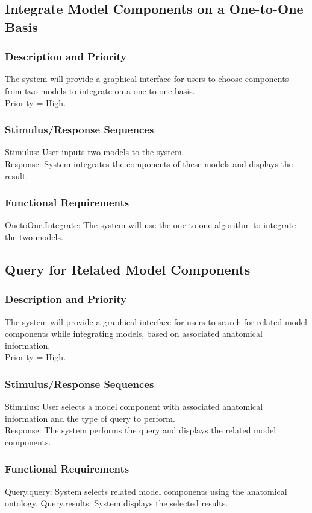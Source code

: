 \documentclass{article}
\begin{document}
\subsection{Integrate Model Components on a One-to-One Basis}
\subsubsection{Description and Priority}
The system will provide a graphical interface for users to choose components from two models to integrate on a one-to-one basis.\\
Priority = High.

\subsubsection{Stimulus/Response Sequences}
Stimulus: User inputs two models to the system.\\
Response: System integrates the components of these models and displays the result.

\subsubsection{Functional Requirements}
OnetoOne.Integrate: The system will use the one-to-one algorithm to integrate the two models.

\subsection{Query for Related Model Components}
\subsubsection{Description and Priority}
The system will provide a graphical interface for users to search for related model components while integrating models, based on associated anatomical information.\\
Priority = High.
\subsubsection{Stimulus/Response Sequences}
Stimulus: User selects a model component with associated anatomical information and the type of query to perform.\\
Response: The system performs the query and displays the related model components.
\subsubsection{Functional Requirements}
Query.query: System selects related model components using the anatomical ontology.
Query.results: System displays the selected results.
\end{document}
